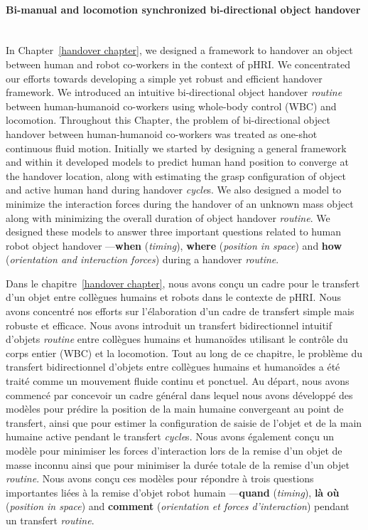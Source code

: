 \paragraph*{\LARGE {Bi-manual and locomotion synchronized bi-directional object handover \\}\\}

In Chapter~\ref{handover chapter}, we designed a framework to handover an object between human and robot co-workers in the context of pHRI. We concentrated our efforts towards developing a simple yet robust and efficient handover framework. We introduced an intuitive bi-directional object handover \textit{routine} between human-humanoid co-workers using whole-body control (WBC) and locomotion. Throughout this Chapter, the problem of bi-directional object handover between human-humanoid co-workers was treated as one-shot continuous fluid motion. Initially we started by designing a general framework and within it developed models to predict human hand position to converge at the handover location, along with estimating the grasp configuration of object and active human hand during handover \textit{cycle}s. We also designed a model to minimize the interaction forces during the handover of an unknown mass object along with minimizing the overall duration of object handover \textit{routine}. We designed these models to answer three important questions related to human robot object handover ---\textbf{when} (\textit{timing}), \textbf{where} (\textit{position in space}) and \textbf{how} (\textit{orientation and interaction forces}) during a handover \textit{routine}.

Dans le chapitre~\ref{handover chapter}, nous avons conçu un cadre pour le transfert d'un objet entre collègues humains et robots dans le contexte de pHRI. Nous avons concentré nos efforts sur l'élaboration d'un cadre de transfert simple mais robuste et efficace. Nous avons introduit un transfert bidirectionnel intuitif d'objets \textit{routine} entre collègues humains et humanoïdes utilisant le contrôle du corps entier (WBC) et la locomotion. Tout au long de ce chapitre, le problème du transfert bidirectionnel d'objets entre collègues humains et humanoïdes a été traité comme un mouvement fluide continu et ponctuel. Au départ, nous avons commencé par concevoir un cadre général dans lequel nous avons développé des modèles pour prédire la position de la main humaine convergeant au point de transfert, ainsi que pour estimer la configuration de saisie de l'objet et de la main humaine active pendant le transfert \textit{cycle}s. Nous avons également conçu un modèle pour minimiser les forces d'interaction lors de la remise d'un objet de masse inconnu ainsi que pour minimiser la durée totale de la remise d'un objet \textit{routine}. Nous avons conçu ces modèles pour répondre à trois questions importantes liées à la remise d'objet robot humain ---\textbf{quand} (\textit{timing}), \textbf{là où} (\textit{position in space}) and \textbf{comment} (\textit{orientation et forces d'interaction}) pendant un transfert \textit{routine}.




